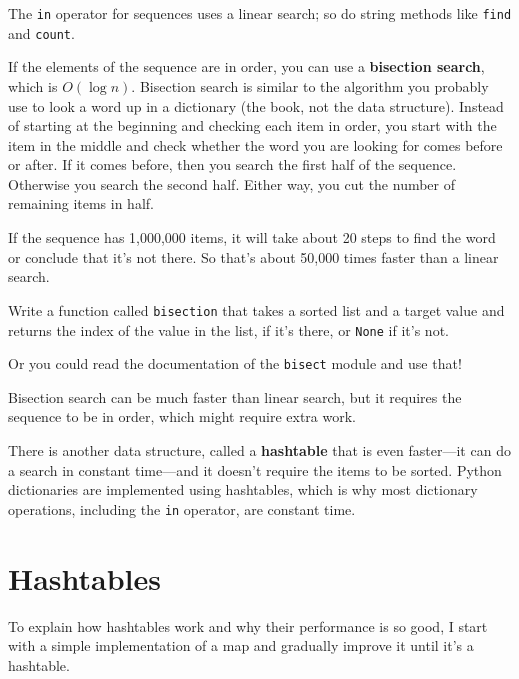 \documentclass[10pt]{book}
\begin{document}
The {\tt in} operator for sequences uses a linear search; so do string
methods like {\tt find} and {\tt count}.

If the elements of the sequence are in order, you can use a {\bf
  bisection search}, which is $O(\log n)$.  Bisection search is
similar to the algorithm you probably use to look a word up in a
dictionary (the book, not the data structure).  Instead of starting at
the beginning and checking each item in order, you start with the item
in the middle and check whether the word you are looking for comes
before or after.  If it comes before, then you search the first half
of the sequence.  Otherwise you search the second half.  Either way,
you cut the number of remaining items in half.  

If the sequence has 1,000,000 items, it will take about 20 steps to
find the word or conclude that it's not there.  So that's about 50,000
times faster than a linear search.

\begin{exercise}

Write a function called {\tt bisection} that takes a sorted list
and a target value and returns the index of the value
in the list, if it's there, or {\tt None} if it's not.


Or you could read the documentation of the {\tt bisect} module
and use that!

\end{exercise}

Bisection search can be much faster than linear search, but
it requires the sequence to be in order, which might require
extra work.

There is another data structure, called a {\bf hashtable} that
is even faster---it can do a search in constant time---and it
doesn't require the items to be sorted.  Python dictionaries
are implemented using hashtables, which is why most dictionary
operations, including the {\tt in} operator, are constant time.


\section{Hashtables}
\label{hashtable}

To explain how hashtables work and why their performance is so
good, I start with a simple implementation of a map and
gradually improve it until it's a hashtable.
\end{document}
